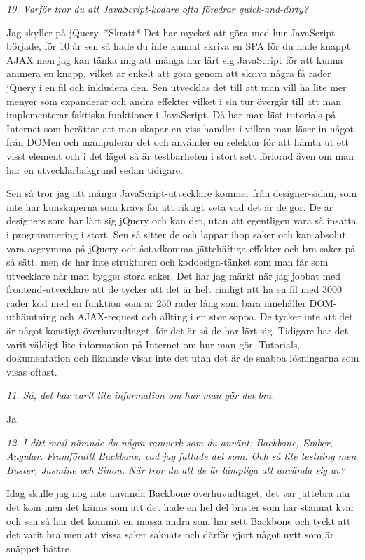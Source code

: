 \documentclass[11pt]{article}
\begin{document}
\emph{10. Varför tror du att JavaScript-kodare ofta föredrar quick-and-dirty?}

Jag skyller på jQuery. *Skratt* Det har mycket att göra med hur JavaScript började, för 10 år sen så hade du inte kunnat skriva en SPA för du hade knappt AJAX men jag kan tänka mig att många har lärt sig JavaScript för att kunna animera en knapp, vilket är enkelt att göra genom att skriva några få rader jQuery i en fil och inkludera den. Sen utvecklas det till att man vill ha lite mer menyer som expanderar och andra effekter vilket i sin tur övergår till att man implementerar faktiska funktioner i JavaScript. Då har man läst tutorials på Internet som berättar att man skapar en viss handler i vilken man läser in något från DOMen och manipulerar det och använder en selektor för att hämta ut ett visst element och i det läget så är testbarheten i stort sett förlorad även om man har en utvecklarbakgrund sedan tidigare.

Sen så tror jag att många JavaScript-utvecklare kommer från designer-sidan, som inte har kunskaperna som krävs för att riktigt veta vad det är de gör. De är designers som har lärt sig jQuery och kan det, utan att egentligen vara så insatta i programmering i stort. Sen så sitter de och lappar ihop saker och kan absolut vara asgrymma på jQuery och åstadkomma jättehäftiga effekter och bra saker på så sätt, men de har inte strukturen och koddesign-tänket som man får som utvecklare när man bygger stora saker. Det har jag märkt när jag jobbat med frontend-utvecklare att de tycker att det är helt rimligt att ha en fil med 3000 rader kod med en funktion som är 250 rader lång som bara innehåller DOM-uthämtning och AJAX-request och allting i en stor soppa. De tycker inte att det är något konstigt överhuvudtaget, för det är så de har lärt sig. Tidigare har det varit väldigt lite information på Internet om hur man gör. Tutorials, dokumentation och liknande visar inte det utan det är de snabba lösningarna som visas oftast.

\emph{11. Så, det har varit lite information om hur man gör det bra.}

Ja.

\emph{12. I ditt mail nämnde du några ramverk som du använt: Backbone, Ember, Angular. Framförallt Backbone, vad jag fattade det som. Och så lite testning men Buster, Jasmine och Sinon. När tror du att de är lämpliga att använda sig av?}

Idag skulle jag nog inte använda Backbone överhuvudtaget, det var jättebra när det kom men det känns som att det hade en hel del brister som har stannat kvar och sen så har det kommit en massa andra som har sett Backbone och tyckt att det varit bra men att vissa saker saknats och därför gjort något nytt som är snäppet bättre.
\end{document}
